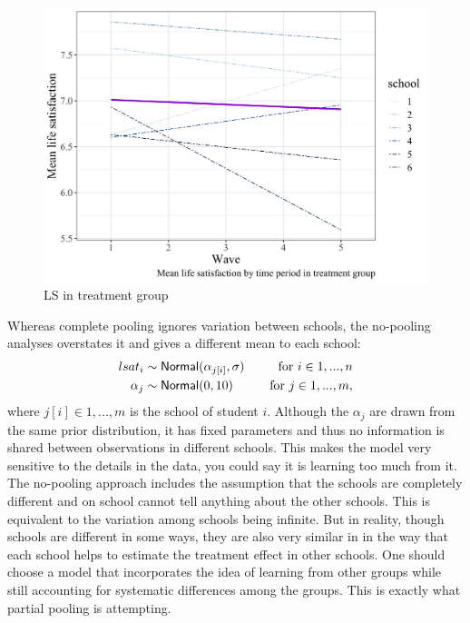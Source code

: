 \documentclass[a4, 12pt]{article}
\begin{document}
\begin{figure}[H]

{\centering \includegraphics[width=0.8\linewidth,]{../figures/lsat_vs_time_by_school_treated} 

}

\caption{LS in treatment group}\label{fig:lsat-vs-time}
\end{figure}

Whereas complete pooling ignores variation between schools, the no-pooling analyses overstates it and gives a different mean to each school:
\begin{align*}
lsat_i & \sim {\sf Normal} (\alpha_{j[i]}, \sigma) & \quad \text{for } i \in 1,...,n \\
\alpha_{j} & \sim {\sf Normal} (0, 10) & \quad \text{for } j \in 1,...,m,
\end{align*}
where \(j[i] \in 1,...,m\) is the school of student \(i\).
Although the \(\alpha_j\) are drawn from the same prior distribution, it has fixed parameters and thus no information is shared between observations in different schools. This makes the model very sensitive to the details in the data, you could say it is learning too much from it. The no-pooling approach includes the assumption that the schools are completely different and on school cannot tell anything about the other schools. This is equivalent to the variation among schools being infinite. But in reality, though schools are different in some ways, they are also very similar in in the way that each school helps to estimate the treatment effect in other schools. One should choose a model that incorporates the idea of learning from other groups while still accounting for systematic differences among the groups. This is exactly what partial pooling is attempting.
\end{document}
